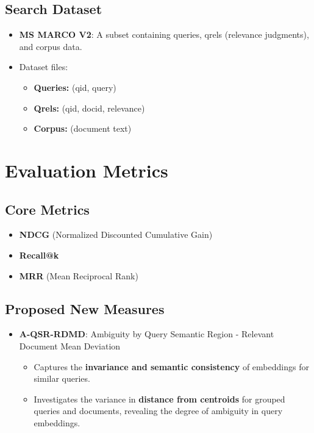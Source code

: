 \documentclass{article}
\begin{document}
\subsection{Search Dataset}
\begin{itemize}
    \item \textbf{MS MARCO V2}: A subset containing queries, qrels (relevance judgments), and corpus data.
    \item Dataset files:
    \begin{itemize}
        \item \textbf{Queries:} (qid, query)
        \item \textbf{Qrels:} (qid, docid, relevance)
        \item \textbf{Corpus:} (document text)
    \end{itemize}
\end{itemize}

\section{Evaluation Metrics}
\subsection{Core Metrics}
\begin{itemize}
    \item \textbf{NDCG} (Normalized Discounted Cumulative Gain)
    \item \textbf{Recall@k}
    \item \textbf{MRR} (Mean Reciprocal Rank)
\end{itemize}

\subsection{Proposed New Measures}
\begin{itemize}
    \item \textbf{A-QSR-RDMD}: Ambiguity by Query Semantic Region - Relevant Document Mean Deviation
    \begin{itemize}
        \item Captures the \textbf{invariance and semantic consistency} of embeddings for similar queries.
        \item Investigates the variance in \textbf{distance from centroids} for grouped queries and documents, revealing the degree of ambiguity in query embeddings.
    \end{itemize}
\end{itemize}
\end{document}
